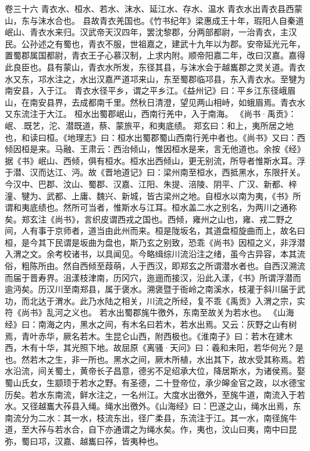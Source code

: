 \documentclass[12pt,UTF8]{ctexbook}
\begin{document}
卷三十六  青衣水、桓水、若水、沫水、延江水、存水、温水 
青衣水出青衣县西蒙山，东与沫水合也。
县故青衣羌国也。《竹书纪年》梁惠成王十年，瑕阳人自秦道岷山、青衣水来归。汉武帝天汉四年，罢沈黎郡，分两部都尉，一治青衣，主汉民。公孙述之有蜀也，青衣不服，世祖嘉之，建武十九年以为郡。安帝延光元年，置蜀郡属国都尉，青衣王子心慕汉制，上求内附。顺帝阳嘉二年，改曰汉嘉。嘉得此良臣也。县有蒙山，青衣水所发，东径其县，与沫水会于越巂郡之灵关道。青衣水又东，邛水注之，水出汉嘉严道邛来山，东至蜀郡临邛县，东入青衣水。至犍为南安县，入于江。
青衣水径平乡，谓之平乡江。《益州记》曰：平乡江东径峨眉山，在南安县界，去成都南千里。然秋日清澄，望见两山相峙，如蛾眉焉。青衣水又东流注于大江。
桓水出蜀郡岷山，西南行羌中，入于南海。
《尚书·禹贡》：岷、.既艺，沱、潜既道，蔡、蒙旅平，和夷底绩。
郑玄曰：和上，夷所居之地也，和读曰桓。《地理志》曰：桓水出蜀郡蜀山西南行羌中者也。《尚书》又曰：西倾因桓是来。马融、王肃云：西治倾山，惟因桓水是来，言无他道也。余按《经》据《书》岷山、西倾，俱有桓水。桓水出西倾山，更无别流，所导者惟斯水耳。浮于潜、汉而达江、沔。故《晋地道记》曰：梁州南至桓水，西抵黑水，东限扞关。今汉中、巴郡、汶山、蜀郡、汉嘉、江阳、朱提、涪陵、阴平、广汉、新都、梓潼、犍为、武都、上庸、魏兴、新城，皆古梁州之地。自桓水以南为夷，《书》所谓和夷底绩也。然所可当者，惟斯水与江耳。桓水盖二水之别名，为两川之通称矣。郑玄注《尚书》，言织皮谓西戎之国也。西倾，雍州之山也，雍、戎二野之间，人有事于京师者，道当由此州而来。桓是陇坂名，其道盘桓旋曲而上，故名曰桓，是今其下民谓是坂曲为盘也，斯乃玄之别致，恐乖《尚书》因桓之义，非浮潜入渭之文。余考校诸书，以具闻见。今略缉综川流沿注之绪，虽今古异容，本其流俗，粗陈所由。然自西倾至葭萌，人于西汉，即郑玄之所谓潜水者也。自西汉溯流而届于晋寿界。沮漾枝津南，历冈穴，迤逦而接汉，沿此入漾，《书》所谓浮潜而逾沔矣。历汉川至南郑县，属于褒水。溯褒暨于衙岭之南溪水，枝灌于斜川届于武功，而北达于渭水。此乃水陆之相关，川流之所经，复不乖《禹贡》入渭之宗，实符《尚书》乱河之义也。
若水出蜀郡旄牛徼外，东南至故关为若水也。
《山海经》曰：南海之内，黑水之间，有木名曰若木，若水出焉。又云：灰野之山有树焉，青叶赤华，厥名若木。生昆仑山西，附西极也。《淮南子》曰：若木在建木西，木有十华，其光照下地。故屈原《离骚·天问》曰：羲和未阳，若华何光？是也。然若木之生，非一所也。黑水之间，厥木所植，水出其下，故水受其称焉。若水沿流，间关蜀土，黄帝长子昌意，德劣不足绍承大位，降居斯水，为诸侯焉。娶蜀山氏女，生颛顼于若水之野。有圣德，二十登帝位，承少皞金官之政，以水德宝历矣。若水东南流，鲜水注之，一名州江。大度水出徼外，至旄牛道，南流入于若水。又径越巂大莋县入绳。绳水出徼外。《山海经》曰：巴遂之山，绳水出焉，东南流分为二水：其一水，枝流东出，径广柔县，东流注于江。其一水，南径旄牛道，至大莋与若水合，自下亦通谓之为绳水矣。作，夷也，汶山曰夷，南中曰昆弥，蜀曰邛，汉嘉、越巂曰莋，皆夷种也。
\end{document}
